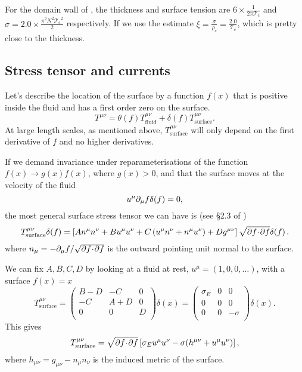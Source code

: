 \documentclass[12pt]{article}
\newcommand{\tc}{\mathcal{T_\mathrm{c}}}
\newcommand{\rc}{\rho_\mathrm{c}}
\begin{document}
For the domain wall of \cite{Aharony:2005bm}, the thickness and surface tension are $6\times \frac{1}{2\pi \tc}$ and $\sigma=2.0 \times \frac{\pi^2 N^2 \tc^2}{2}$ respectively. If we use the estimate $\xi = \frac{\sigma}{\rc} = \frac{2.0}{\tc}$, which is pretty close to the thickness.

\subsection{Stress tensor and currents}\label{sec:surfstr}

Let's describe the location of the surface by a function $f(x)$ that is positive inside the fluid and has a first order zero on the surface.
%
\begin{equation}\label{fluidsurf:eq}
  T^{\mu\nu} = \theta(f)T^{\mu\nu}_\text{fluid} + \delta(f)T^{\mu\nu}_\text{surface}.
\end{equation}
%
At large length scales, as mentioned above, $T^{\mu\nu}_\text{surface}$ will only depend on the first derivative of $f$ and no higher derivatives.

If we demand invariance under reparameterisations of the function $f(x) \to g(x)f(x)$, where $g(x) > 0$, and that the surface moves at the velocity of the fluid
%
\begin{equation}\label{surfvel:eq}
  u^\mu \partial_\mu f \delta(f) =0,
\end{equation}
%
the most general surface stress tensor we can have is (see \S2.3 of \cite{Lahiri:2007ae})
%
\begin{equation*}
    T^{\mu\nu}_\mathrm{surface}\delta(f) = \left [ A n^\mu n^\nu
                   +B u^\mu u^\nu
                   +C \left ( u^\mu n^\nu + n^\mu u^\nu \right )
                   +D g^{\mu\nu} \right ]\sqrt{\partial f\!\cdot\!\partial f}\delta(f)\,.
\end{equation*}
%
%
where $n_\mu = -\partial_\mu f / \sqrt{\partial f \!\cdot\! \partial f}$ is the outward pointing unit normal to the surface.

We can fix $A,B,C,D$ by looking at a fluid at rest, $u^\mu = (1,0,0,\ldots)$, with a surface $f(x)=x$
%
\begin{equation*}
  T^{\mu\nu}_\mathrm{surface} =
  \begin{pmatrix}
    B-D & -C   & 0  \\
    -C   & A+D & 0  \\
    0   & 0   & D  \\
  \end{pmatrix}
     \delta(x)=
  \begin{pmatrix}
    \sigma_E & 0 &  0   \\
    0 & 0 &  0   \\
    0 & 0 & -\sigma   \\
  \end{pmatrix}
     \delta(x).
\end{equation*}
%
This gives
%
\begin{equation}\label{surfstressgen:eq}
  T^{\mu\nu}_\text{surface} = \sqrt{\partial f \!\cdot\! \partial f} \left [ \sigma_E u^\mu u^\nu -\sigma(h^{\mu\nu} + u^\mu u^\nu) \right ],
\end{equation}
%
where $h_{\mu\nu} = g_{\mu\nu} - n_\mu n_\nu$ is the induced metric of the surface.
\end{document}
